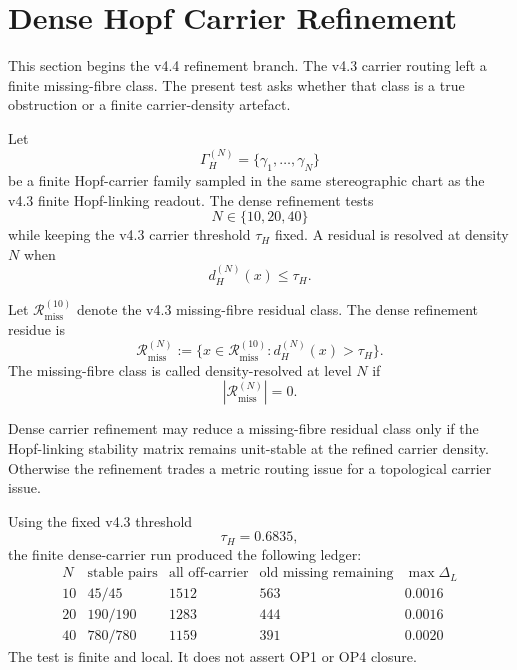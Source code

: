 
\section{Dense Hopf Carrier Refinement}
\label{sec:dense-hopf-carrier-refinement}

This section begins the v4.4 refinement branch.  The v4.3 carrier routing left a
finite missing-fibre class.  The present test asks whether that class is a
true obstruction or a finite carrier-density artefact.

\begin{definition}
Let
\[
    \Gamma_H^{(N)}=\{\gamma_1,\ldots,\gamma_N\}
\]
be a finite Hopf-carrier family sampled in the same stereographic chart as the
v4.3 finite Hopf-linking readout.  The dense refinement tests
\[
    N\in\{10,20,40\}
\]
while keeping the v4.3 carrier threshold \(\tau_H\) fixed.  A residual is
resolved at density \(N\) when
\[
    d_H^{(N)}(x)\leq \tau_H.
\]
\end{definition}

\begin{definition}
Let \(\mathcal R_{\mathrm{miss}}^{(10)}\) denote the v4.3 missing-fibre
residual class.  The dense refinement residue is
\[
    \mathcal R_{\mathrm{miss}}^{(N)}
    :=
    \{x\in\mathcal R_{\mathrm{miss}}^{(10)}:d_H^{(N)}(x)>\tau_H\}.
\]
The missing-fibre class is called density-resolved at level \(N\) if
\[
    |\mathcal R_{\mathrm{miss}}^{(N)}|=0.
\]
\end{definition}

\begin{proposition}
Dense carrier refinement may reduce a missing-fibre residual class only if the
Hopf-linking stability matrix remains unit-stable at the refined carrier
density.  Otherwise the refinement trades a metric routing issue for a
topological carrier issue.
\end{proposition}

\begin{remark}
Using the fixed v4.3 threshold
\[
    \tau_H = 0.6835,
\]
the finite dense-carrier run produced the following ledger:
\[
\begin{array}{c|r|r|r|r}
N & \text{stable pairs} & \text{all off-carrier} &
\text{old missing remaining} & \max\Delta_L\\
\hline
10 & 45/45 & 1512 & 563 & 0.0016\\
20 & 190/190 & 1283 & 444 & 0.0016\\
40 & 780/780 & 1159 & 391 & 0.0020
\end{array}
\]
The test is finite and local.  It does not assert OP1 or OP4 closure.
\end{remark}

